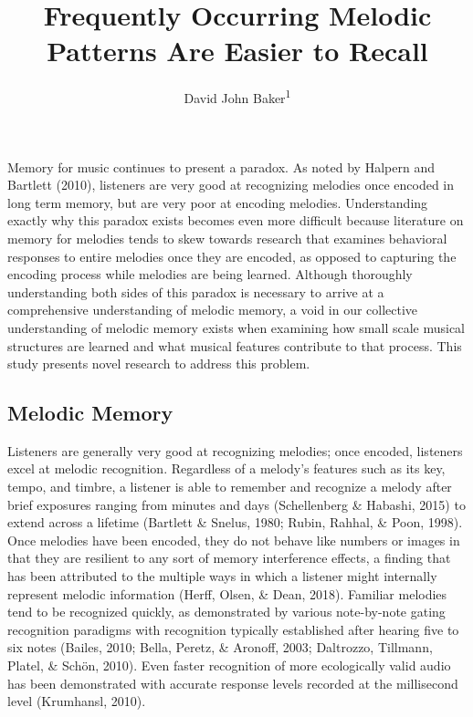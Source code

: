 \documentclass[english,man,floatsintext]{apa6}
\title{Frequently Occurring Melodic Patterns Are Easier to Recall}
\author{David John Baker\textsuperscript{1}}
\date{}
\affiliation{\vspace{0.5cm}\textsuperscript{1} Department of Computing, Goldsmiths, University of London}
\begin{document}
\maketitle

Memory for music continues to present a paradox.
As noted by Halpern and Bartlett (2010), listeners are very good at recognizing melodies once encoded in long term memory, but are very poor at encoding melodies.
Understanding exactly why this paradox exists becomes even more difficult because literature on memory for melodies tends to skew towards research that examines behavioral responses to entire melodies once they are encoded, as opposed to capturing the encoding process while melodies are being learned.
Although thoroughly understanding both sides of this paradox is necessary to arrive at a comprehensive understanding of melodic memory, a void in our collective understanding of melodic memory exists when examining how small scale musical structures are learned and what musical features contribute to that process.
This study presents novel research to address this problem.

\hypertarget{melodic-memory}{%
\subsection{Melodic Memory}\label{melodic-memory}}

Listeners are generally very good at recognizing melodies; once encoded, listeners excel at melodic recognition.
Regardless of a melody's features such as its key, tempo, and timbre, a listener is able to remember and recognize a melody after brief exposures ranging from minutes and days (Schellenberg \& Habashi, 2015) to extend across a lifetime (Bartlett \& Snelus, 1980; Rubin, Rahhal, \& Poon, 1998).
Once melodies have been encoded, they do not behave like numbers or images in that they are resilient to any sort of memory interference effects, a finding that has been attributed to the multiple ways in which a listener might internally represent melodic information (Herff, Olsen, \& Dean, 2018).
Familiar melodies tend to be recognized quickly, as demonstrated by various note-by-note gating recognition paradigms with recognition typically established after hearing five to six notes (Bailes, 2010; Bella, Peretz, \& Aronoff, 2003; Daltrozzo, Tillmann, Platel, \& Schön, 2010).
Even faster recognition of more ecologically valid audio has been demonstrated with accurate response levels recorded at the millisecond level (Krumhansl, 2010).
\end{document}
